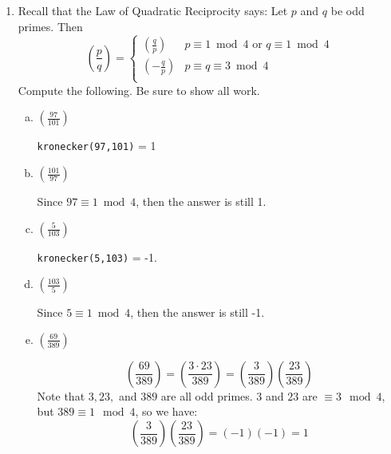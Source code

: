 \documentclass[12pt]{amsart}
\theoremstyle{plain}
\theoremstyle{definition}
\begin{document}
\begin{enumerate}[1.]
\begin{enumerate}[a.]
\begin{framed}
		\end{framed}
	\end{enumerate}
	\item Recall that the Law of Quadratic Reciprocity says:  Let $p$ and $q$ be odd primes.  Then
		\[ \left( \frac{p}{q}\right) = \begin{cases} 
      		\left( \frac{q}{p}\right) & p \equiv 1 \bmod 4 \text{ or } q \equiv 1 \bmod 4\\
      		\left( -\frac{q}{p}\right) & p \equiv q \equiv 3 \bmod 4\\
  		 \end{cases}
		\]
		Compute the following.  Be sure to show all work.
		\begin{enumerate}[a.]
		\item  $\left(\frac{97}{101}\right)$
		\begin{framed}
		\texttt{kronecker(97,101)} = 1
		\end{framed}
		\item $\left(\frac{101}{97}\right)$
		\begin{framed}
		Since $97 \equiv 1 \bmod 4$, then the answer is still 1.
		\end{framed}
		\item $\left(\frac{5}{103}\right)$
		\begin{framed}
		\texttt{kronecker(5,103)} = -1.
		\end{framed}
		\item $\left(\frac{103}{5}\right)$
		\begin{framed}
		Since $5 \equiv 1 \bmod 4$, then the answer is still -1.
		\end{framed}
		\item $\left(\frac{69}{389}\right)$
		\begin{framed}
		$$\left(\frac{69}{389}\right)= \left(\frac{3 \cdot 23}{389}\right) = \left(\frac{3}{389}\right)\left(\frac{23}{389}\right)$$
		Note that $3, 23,$ and $389$ are all odd primes.  $3$ and $23$ are $\equiv 3 \mod 4$, but $389 \equiv 1 \mod 4$, so we have:
		$$\left(\frac{3}{389}\right)\left(\frac{23}{389}\right) = (-1)(-1) = 1$$
		\end{framed}
		\end{enumerate}
\end{enumerate}
\end{document}
